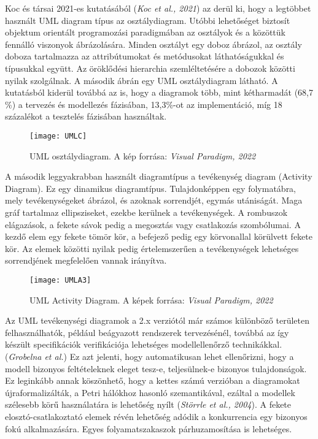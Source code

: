 \documentclass[12pt]{article}
\begin{document}
Koc és társai 2021-es kutatásából  (\textit{Koc et al., 2021}) az derül ki, hogy a legtöbbet használt UML diagram típus az osztálydiagram. Utóbbi lehetőséget biztosít objektum orientált programozási paradigmában az osztályok és a közöttük fennálló viszonyok ábrázolására. Minden osztályt egy doboz ábrázol, az osztály doboza tartalmazza az attribútumokat és metódusokat láthatóságukkal és típusukkal együtt. Az öröklődési hierarchia szemléltetésére a dobozok közötti nyilak szolgálnak.  A második ábrán egy UML osztálydiagram látható. A kutatásból kiderül továbbá az is, hogy a diagramok több, mint kétharmadát (68,7 \%)  a tervezés és modellezés fázisában, 13,3\%-ot az implementáció, míg 18 százalékot a tesztelés fázisában használtak.

\begin{figure}
\centering
\texttt{[image: UMLC]}
\caption{UML osztálydiagram. A kép forrása:  \textit{Visual Paradigm, 2022}
}
\end{figure}

A második leggyakrabban használt diagramtípus a tevékenység diagram (Activity Diagram). Ez egy dinamikus diagramtípus. Tulajdonképpen egy folymatábra, mely tevékenységeket ábrázol, és azoknak sorrendjét, egymás utániságát. Maga gráf tartalmaz ellipsziseket, ezekbe kerülnek a tevékenységek. A rombuszok elágazások, a fekete sávok pedig a megosztás vagy csatlakozás szombólumai. A kezdő elem egy fekete tömör kör, a befejező pedig egy körvonallal körülvett fekete kör. Az elemek közötti nyilak pedig értelemszerűen a tevékenységek lehetséges sorrendjének megfelelően vannak irányítva. 

\begin{figure}
\centering
\texttt{[image: UMLA3]}
\caption{UML Activity Diagram. A képek forrása:  \textit{Visual Paradigm, 2022}
}
\end{figure}

Az UML tevékenységi diagramok a 2.x verziótól már számos különböző területen felhasználhatók, például beágyazott rendszerek tervezésénél, továbbá az így készült specifikációk verifikációja lehetséges modellellenőrző technikákkal. (\textit{Grobelna et al.}) Ez azt jelenti, hogy automatikusan lehet ellenőrizni, hogy a modell bizonyos feltételeknek eleget tesz-e, teljesülnek-e bizonyos tulajdonságok. Ez leginkább annak köszönhető, hogy a kettes számú verzióban a diagramokat újraformalizálták, a Petri hálókhoz hasonló szemantikával, ezáltal a modellek szélesebb körű használatára is lehetőség nyílt  (\textit{Störrle et al., 2004}). A fekete elosztó-csatlakoztató elemek révén lehetőség adódik a konkurrencia egy bizonyos fokú alkalmazására. Egyes folyamatszakaszok párhuzamosítása is lehetséges.
\end{document}
